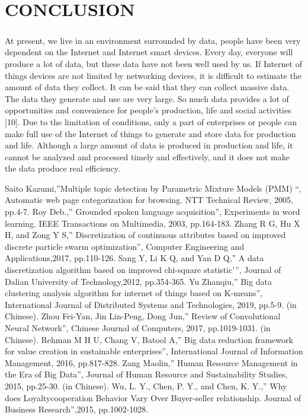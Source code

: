 \documentclass[12pt]{report}
\begin{document}
\chapter{CONCLUSION}

 \paragraph{} At present, we live in an environment surrounded by data, people have been very dependent on the
Internet and Internet smart devices. Every day, everyone will produce a lot of data, but these data have
not been well used by us. If Internet of things devices are not limited by networking devices, it is
difficult to estimate the amount of data they collect. It can be said that they can collect massive data.
The data they generate and use are very large. So much data provides a lot of opportunities and
convenience for people’s production, life and social activities [10]. Due to the limitation of conditions,
only a part of enterprises or people can make full use of the Internet of things to generate and store
data for production and life. Although a large amount of data is produced in production and life, it
cannot be analyzed and processed timely and effectively, and it does not make the data produce real
efficiency.

\newpage
\renewcommand\bibname{References}

\begin{thebibliography}{1}

 Saito Kazumi,”Multiple topic detection by Parametric Mixture Models (PMM) “, Automatic web
page categorization for browsing. NTT Technical Review, 2005, pp.4-7.
\bibitem[2]{} Roy Deb.,” Grounded spoken language acquisition”, Experiments in word learning. IEEE
Transactions on Multimedia, 2003, pp.164-183.
\bibitem[3]{} Zhang R G, Hu X H, and Zong Y S,” Discretization of continuous attributes based on improved
discrete particle swarm optimization”, Computer Engineering and Applications,2017, pp.110-126.
\bibitem[4]{} Sang Y, Li K Q, and Yan D Q,” A data discretization algorithm based on improved chi-square
statistic’”, Journal of Dalian University of Technology,2012, pp.354-365.
\bibitem[5]{} Yu Zhanqiu,” Big data clustering analysis algorithm for internet of things based on K-means”,
International Journal of Distributed Systems and Technologies, 2019, pp.5-9. (in Chinese).
\bibitem[6]{} Zhou Fei-Yan, Jin Lin-Peng, Dong Jun,” Review of Convolutional Neural Network”, Chinese
Journal of Computers, 2017, pp.1019-1031. (in Chinese).
\bibitem[7]{} Rehman M H U, Chang V, Batool A,” Big data reduction framework for value creation in
sustainable enterprises”, International Journal of Information Management, 2016, pp.817-828.
\bibitem[8]{} Zang Maolin,” Human Resource Management in the Era of Big Data”, Journal of Human Resource
and Sustainability Studies, 2015, pp.25-30. (in Chinese).
\bibitem[9]{} Wu, L. Y., Chen, P. Y., and Chen, K. Y.,” Why does Loyaltycooperation Behavior Vary Over
Buyer-seller relationship. Journal of Business Research”,2015, pp.1002-1028.



\end{thebibliography}
\end{document}
